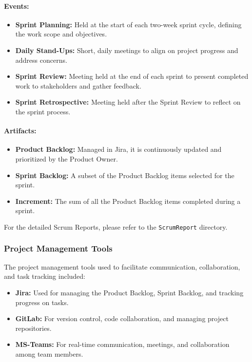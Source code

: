 \documentclass{article}
\begin{document}
    \paragraph{Events:}
    \begin{itemize}
        \item \textbf{Sprint Planning:} Held at the start of each two-week sprint cycle, defining the work scope and objectives.
        \item \textbf{Daily Stand-Ups:} Short, daily meetings to align on project progress and address concerns.
        \item \textbf{Sprint Review:} Meeting held at the end of each sprint to present completed work to stakeholders and gather feedback.
        \item \textbf{Sprint Retrospective:} Meeting held after the Sprint Review to reflect on the sprint process.
    \end{itemize}

    \paragraph{Artifacts:}
    \begin{itemize}
        \item \textbf{Product Backlog:} Managed in Jira, it is continuously updated and prioritized by the Product Owner.
        \item \textbf{Sprint Backlog:} A subset of the Product Backlog items selected for the sprint.
        \item \textbf{Increment:} The sum of all the Product Backlog items completed during a sprint.
    \end{itemize}

    \noindent For the detailed Scrum Reports, please refer to the \texttt{ScrumReport} directory.

    \subsubsection{Project Management Tools}

    The project management tools used to facilitate communication, collaboration, and task tracking included:

    \begin{itemize}
        \item \textbf{Jira:} Used for managing the Product Backlog, Sprint Backlog, and tracking progress on tasks.
        \item \textbf{GitLab:} For version control, code collaboration, and managing project repositories.
        \item \textbf{MS-Teams:} For real-time communication, meetings, and collaboration among team members.
    \end{itemize}
\end{document}
